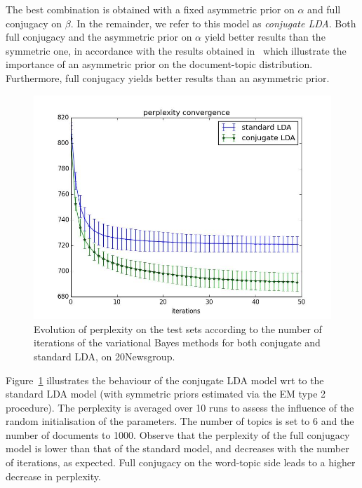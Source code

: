 The best combination is obtained with a fixed asymmetric prior on $\alpha$ and full conjugacy on $\beta$. In the remainder, we refer to this model as {\em conjugate LDA}. Both full conjugacy and the asymmetric prior on $\alpha$ yield better results than the symmetric one, in accordance with the results obtained in~\cite{wallach_rethinking_2009} which illustrate the importance of an asymmetric prior on the document-topic distribution. Furthermore, full conjugacy yields better results than an asymmetric prior.

\begin{figure}[ht]
\includegraphics[scale=0.4]{results/pp_conv}
\caption{\label{fig:pp-exple}Evolution of perplexity on the test sets according to the number of iterations of the variational Bayes methods for both conjugate and standard LDA, on 20Newsgroup.}
\end{figure}
Figure~\ref{fig:pp-exple} illustrates the behaviour of the conjugate LDA model wrt to the standard LDA model (with symmetric priors estimated via the EM type 2 procedure). The perplexity is averaged over 10 runs to assess the influence of the random initialisation of the parameters. The number of topics is set to 6 and the number of documents to 1000. Observe that the perplexity of the full conjugacy model is lower than that of the standard model, and decreases with the number of iterations, as expected. Full conjugacy on the word-topic side leads to a higher decrease in perplexity.

